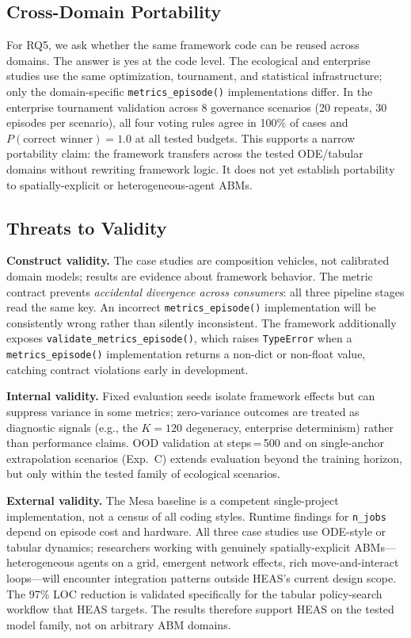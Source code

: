 \documentclass{wscpaperproc}
\begin{document}
\subsection{Cross-Domain Portability}
\label{sec:crossdomain}

For RQ5, we ask whether the same framework code can be reused
across domains. The answer is yes at the code level. The ecological and
enterprise studies use the same optimization, tournament, and statistical
infrastructure; only the domain-specific \texttt{metrics\_episode()}
implementations differ. In the enterprise tournament validation across 8
governance scenarios (20 repeats, 30 episodes per scenario), all four voting
rules agree in 100\% of cases and $P(\text{correct winner})\!=\!1.0$ at all
tested budgets. This supports a narrow portability claim: the framework
transfers across the tested ODE/tabular domains without rewriting framework
logic. It does not yet establish portability to spatially-explicit or
heterogeneous-agent ABMs.

\subsection{Threats to Validity}

\textbf{Construct validity.} The case studies are composition vehicles, not
calibrated domain models; results are evidence about framework behavior. The
metric contract prevents \emph{accidental divergence across consumers}: all
three pipeline stages read the same key. An incorrect \texttt{metrics\_episode()}
implementation will be consistently wrong rather than silently inconsistent. The
framework additionally exposes \texttt{validate\_metrics\_episode()}, which raises
\texttt{TypeError} when a \texttt{metrics\_episode()} implementation returns a
non-dict or non-float value, catching contract violations early in development.

\textbf{Internal validity.} Fixed evaluation seeds isolate framework effects
but can suppress variance in some metrics; zero-variance outcomes are treated as
diagnostic signals (e.g., the $K\!=\!120$ degeneracy, enterprise determinism)
rather than performance claims. OOD validation at steps\,=\,500 and on
single-anchor extrapolation scenarios (Exp.~C) extends evaluation beyond the
training horizon, but only within the tested family of ecological scenarios.

\textbf{External validity.} The Mesa baseline is a competent single-project
implementation, not a census of all coding styles. Runtime findings for
\texttt{n\_jobs} depend on episode cost and hardware. All three case studies
use ODE-style or tabular dynamics; researchers working with genuinely
spatially-explicit ABMs---heterogeneous agents on a grid, emergent network
effects, rich move-and-interact loops---will encounter integration patterns
outside HEAS's current design scope. The 97\% LOC reduction is validated
specifically for the tabular policy-search workflow that HEAS targets. The
results therefore support HEAS on the tested model family, not on arbitrary ABM
domains.
\end{document}
